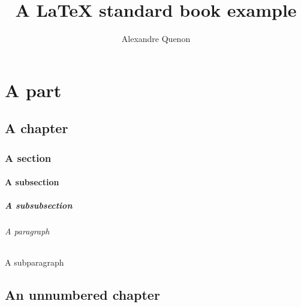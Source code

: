 \documentclass[11pt, a4paper]{book}
\title{A \LaTeX{} standard book example}
\author{Alexandre Quenon}
\begin{document}

\maketitle


\frontmatter

\tableofcontents


\mainmatter


\part{A part}

	\lipsum


\chapter{A chapter}

	\lipsum[1]


	\section{A section}
	
		\lipsum[2]
		
		
		\subsection{A subsection}
		
			\lipsum[3]
			
			
			\subsubsection{A subsubsection}
			
				\lipsum[4]
				
				
				\paragraph{A paragraph}
				
					\lipsum[5]
					
					
					\subparagraph{A subparagraph}
					
						\lipsum[6]
	

\chapter*{An unnumbered chapter}
\end{document}
